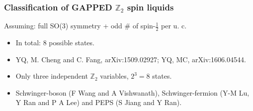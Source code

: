 \documentclass[xcolor=table, 10pt, aspectratio=169]{beamer}
\begin{document}
\begin{frame}
  \frametitle{Classification of GAPPED $\mathbb Z_2$ spin liquids}
  Assuming: full SO(3) symmetry + odd # of spin-$\frac12$ per u. c.
  \begin{itemize}
  \item In total: 8 possible states.
  \item YQ, M. Cheng and C. Fang, arXiv:1509.02927; YQ, MC, arXiv:1606.04544.
  \item Only three independent $\mathbb Z_2$ variables, $2^3=8$
    states.
  \item Schwinger-boson (F Wang and A Vishwanath), Schwinger-fermion
    (Y-M Lu, Y Ran and P A Lee) and PEPS (S Jiang and Y Ran).
  \end{itemize}
\end{frame}
\end{document}
